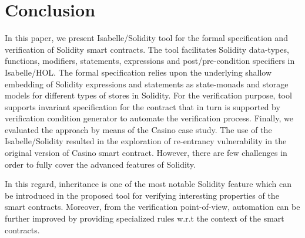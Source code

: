 \documentclass[a4paper,UKenglish,cleveref, autoref, thm-restate]{oasics-v2021}
\begin{document}
%

\section{Conclusion}
%
In this paper, we present Isabelle/Solidity tool for the formal specification and verification of Solidity smart contracts. 
%
The tool facilitates Solidity data-types, functions, modifiers, statements, expressions and post/pre-condition specifiers in Isabelle/HOL.
%
%
The formal specification relies upon the underlying shallow embedding of Solidity expressions and statements as state-monads and storage models for different types of stores in Solidity.
%
For the verification purpose, tool supports invariant specification for the contract that in turn is supported by verification condition generator to automate the verification process.
%
Finally, we evaluated the approach by means of the Casino case study.
%
The use of the Isabelle/Solidity resulted in the exploration of re-entrancy vulnerability in the original version of Casino smart contract.
%
However, there are few  challenges in order to  fully cover the advanced features of Solidity. 
%

%
In this regard, inheritance is one of the most notable Solidity feature which can be introduced in the proposed tool for verifying interesting properties of the smart contracts.
%
Moreover, from the verification point-of-view, automation can be further improved by providing specialized rules w.r.t the context of the smart contracts.
\end{document}
